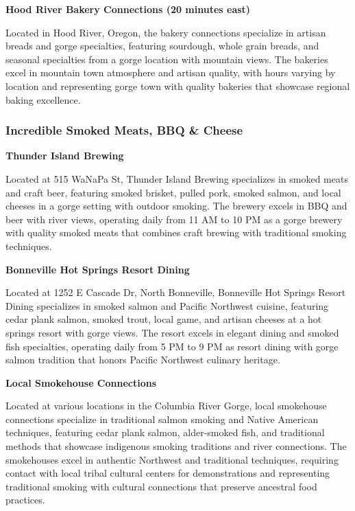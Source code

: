 \documentclass[
  11pt,
  letterpaper,
  DIV=10,
  numbers=noendperiod]{scrartcl}
\begin{document}
\textbf{Hood River Bakery Connections (20 minutes east)}

Located in Hood River, Oregon, the bakery connections specialize in
artisan breads and gorge specialties, featuring sourdough, whole grain
breads, and seasonal specialties from a gorge location with mountain
views. The bakeries excel in mountain town atmosphere and artisan
quality, with hours varying by location and representing gorge town with
quality bakeries that showcase regional baking excellence.

\subsubsection{Incredible Smoked Meats, BBQ \&
Cheese}\label{incredible-smoked-meats-bbq-cheese-4}

\textbf{Thunder Island Brewing}

Located at 515 WaNaPa St, Thunder Island Brewing specializes in smoked
meats and craft beer, featuring smoked brisket, pulled pork, smoked
salmon, and local cheeses in a gorge setting with outdoor smoking. The
brewery excels in BBQ and beer with river views, operating daily from 11
AM to 10 PM as a gorge brewery with quality smoked meats that combines
craft brewing with traditional smoking techniques.

\textbf{Bonneville Hot Springs Resort Dining}

Located at 1252 E Cascade Dr, North Bonneville, Bonneville Hot Springs
Resort Dining specializes in smoked salmon and Pacific Northwest
cuisine, featuring cedar plank salmon, smoked trout, local game, and
artisan cheeses at a hot springs resort with gorge views. The resort
excels in elegant dining and smoked fish specialties, operating daily
from 5 PM to 9 PM as resort dining with gorge salmon tradition that
honors Pacific Northwest culinary heritage.

\textbf{Local Smokehouse Connections}

Located at various locations in the Columbia River Gorge, local
smokehouse connections specialize in traditional salmon smoking and
Native American techniques, featuring cedar plank salmon, alder-smoked
fish, and traditional methods that showcase indigenous smoking
traditions and river connections. The smokehouses excel in authentic
Northwest and traditional techniques, requiring contact with local
tribal cultural centers for demonstrations and representing traditional
smoking with cultural connections that preserve ancestral food
practices.
\end{document}
